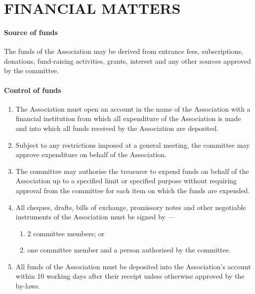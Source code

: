 \documentclass[../constitution.tex]{subfiles}
\begin{document}
\hypertarget{part-7-financial-matters}{%
\part{FINANCIAL MATTERS}\label{part-7-financial-matters}}

\hypertarget{source-of-funds}{%
\subsection{Source of funds}\label{source-of-funds}}

The funds of the Association may be derived from entrance fees, subscriptions, donations, fund-raising activities, grants, interest and any other sources approved by the committee.

\hypertarget{control-of-funds}{%
\subsection{Control of funds}\label{control-of-funds}}

\begin{enumerate}

\item The Association must open an account in the name of the Association with a financial institution from which all expenditure of the Association is made and into which all funds received by the Association are deposited.
\item Subject to any restrictions imposed at a general meeting, the committee may approve expenditure on behalf of the Association.
\item The committee may authorise the treasurer to expend funds on behalf of the Association up to a specified limit or specified purpose without requiring approval from the committee for each item on which the funds are expended.
\item All cheques, drafts, bills of exchange, promissory notes and other negotiable instruments of the Association must be signed by ---

  \begin{enumerate}
  
  \item 2 committee members; or
  \item one committee member and a person authorised by the committee.
  \end{enumerate}
\item All funds of the Association must be deposited into the Association's account within 10 working days after their receipt unless otherwise approved by the by-laws.
\end{enumerate}
\end{document}
